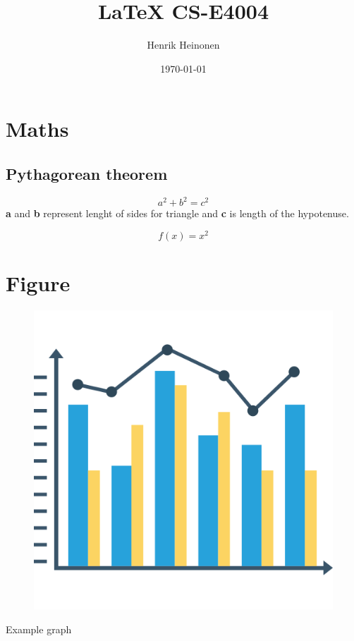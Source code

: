 \documentclass{article}
\title{LaTeX CS-E4004}
\author{Henrik Heinonen}
\date{\today}
\begin{document}
\maketitle

\newpage


\tableofcontents
\newpage

\section{Maths}

\subsection{Pythagorean theorem}

\begin{equation*}
    a^2 + b^2 = c^2
\end{equation*}
\textbf{a} and \textbf{b} represent lenght of sides for triangle and \textbf{c} is length of the hypotenuse.

\begin{center}
    \begin{equation*}
        f(x) = x^2
    \end{equation*}
\end{center}

\section{Figure}

\begin{figure}[h!]
    \centering
    \includegraphics[width=\linewidth]{graph.png}
\end{figure}
Example graph \cite{WEBSITE:1}

\newpage


\end{document}
